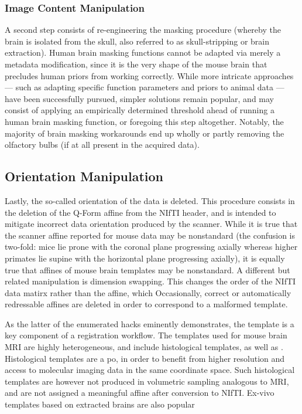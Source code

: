 \subsubsection{Image Content Manipulation}
A second step consists of re-engineering the masking procedure (whereby the brain is isolated from the skull, also referred to as skull-stripping or brain extraction).
Human brain masking functions cannot be adapted via merely a metadata modification, since it is the very shape of the mouse brain that precludes human priors from working correctly.
While more intricate approaches --- such as adapting specific function parameters and priors to animal data \cite{rbet} --- have been successfully pursued, simpler solutions remain popular, and may consist of applying an empirically determined threshold ahead of running a human brain masking function, or foregoing this step altogether.
Notably, the majority of brain masking workarounds end up wholly or partly removing the olfactory bulbs (if at all present in the acquired data).

\subsection{Orientation Manipulation}
Lastly, the so-called orientation of the data is deleted.
This procedure consists in the deletion of the Q-Form affine from the NIfTI header, and is intended to mitigate incorrect data orientation produced by the scanner.
While it is true that the scanner affine reported for mouse data may be nonstandard (the confusion is two-fold: mice lie prone with the coronal plane progressing axially whereas higher primates lie supine with the horizontal plane progressing axially), it is equally true that affines of mouse brain templates may be nonstandard.
A different but related manipulation is dimension swapping.
This changes the order of the NIfTI data matirx rather than the affine, which 
Occasionally, correct or automatically redressable affines are deleted in order to correspond to a malformed template.

As the latter of the enumerated hacks eminently demonstrates, the template is a key component of a registration workflow.
The templates used for mouse brain MRI are highly heterogeneous, and include histological templates, as well as .
Histological templates are a po, in order to benefit from higher resolution and access to molecular imaging data in the same coordinate space.
Such histological templates are however not produced in volumetric sampling analogous to MRI, and are not assigned a meaningful affine after conversion to NIfTI.
Ex-vivo templates based on extracted brains are also popular

